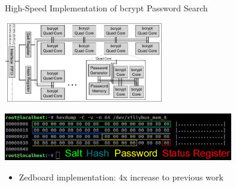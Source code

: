 \documentclass[%
    10pt,
    professionalfont,
    aspectratio=169,
    xcolor=dvipsnames, 
]{beamer}
\begin{document}
\begin{frame}{High-Speed Implementation of bcrypt Password Search}
    \centering

    \includegraphics[height=100pt]{data/bcrypt-overview.pdf}

    \includegraphics[width=0.75\textwidth]{data/bcrypt-mem-layout.png}
    \begin{itemize}
        \item Zedboard implementation: 4x increase to previous work
    \end{itemize}
\end{frame}
\end{document}

